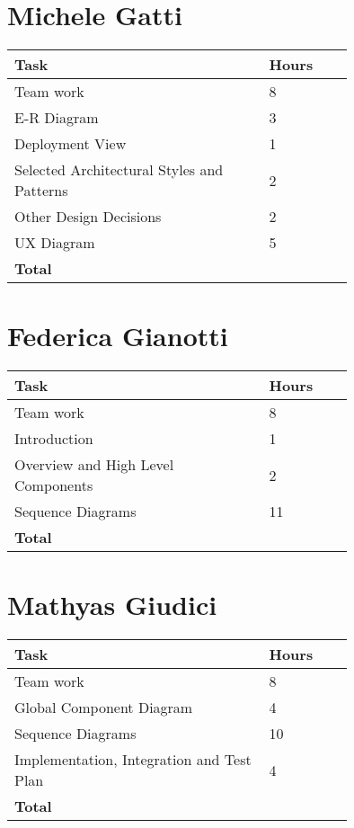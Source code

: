 \section{Michele Gatti}

\smallskip
\begin{center}
\begin{tabular}{ | p{0.75\linewidth} | l | }
  \hline
    \textbf{Task} & \textbf{Hours }\\ \hline
     Team work & 8 \\ \hline
     E-R Diagram & 3 \\ \hline
     Deployment View & 1 \\ \hline
     Selected Architectural Styles and Patterns & 2 \\ \hline
     Other Design Decisions & 2 \\ \hline
     UX Diagram & 5 \\ \hline
    \textbf{Total} & \textbf{} \\ \hline
\end{tabular}
\end{center}
\smallskip


\section{Federica Gianotti}

\smallskip
\begin{center}
\begin{tabular}{ | p{0.75\linewidth} | l | }
  \hline
    \textbf{Task} & \textbf{Hours }\\ \hline
    Team work & 8 \\ \hline
    Introduction & 1 \\ \hline
    Overview and High Level Components & 2 \\ \hline
    Sequence Diagrams & 11 \\ \hline
   \textbf{Total} & \textbf{} \\ \hline
\end{tabular}
\end{center}
\smallskip

\section{Mathyas Giudici}

\smallskip
\begin{center}
\begin{tabular}{ | p{0.75\linewidth} | l | }
  \hline
    \textbf{Task} & \textbf{Hours }\\ \hline
    Team work & 8 \\ \hline
    Global Component Diagram & 4 \\ \hline
    Sequence Diagrams & 10 \\ \hline
    Implementation, Integration and Test Plan & 4 \\ \hline
   \textbf{Total} & \textbf{} \\ \hline
\end{tabular}
\end{center}

\clearpage
